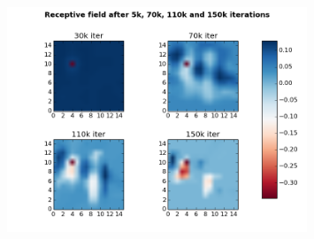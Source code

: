 \begin{figure}[H]
 \centering
 \includegraphics[width = 0.8\textwidth]{../results/exercise3c}
 \caption{}
 \label{fig:bild4}
\end{figure}


